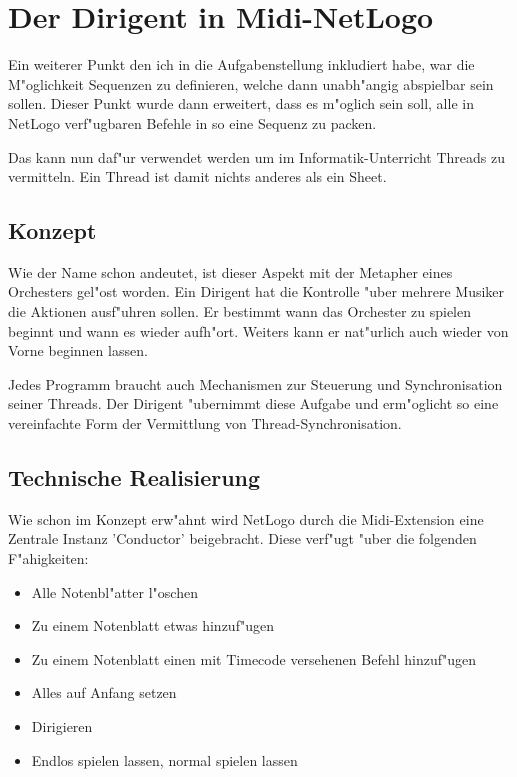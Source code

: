 \section{Der Dirigent in Midi-NetLogo}
Ein weiterer Punkt den ich in die Aufgabenstellung inkludiert habe, war die
M"oglichkeit Sequenzen zu definieren, welche dann unabh"angig abspielbar sein 
sollen. Dieser Punkt wurde dann erweitert, dass es m"oglich sein soll, alle
in NetLogo verf"ugbaren Befehle in so eine Sequenz zu packen. 

Das kann nun daf"ur verwendet werden um im Informatik-Unterricht Threads zu
vermitteln. Ein Thread ist damit nichts anderes als ein Sheet. 

\subsection{Konzept}
Wie der Name schon andeutet, ist dieser Aspekt mit der Metapher eines Orchesters
gel"ost worden. Ein Dirigent hat die Kontrolle "uber mehrere Musiker die 
Aktionen ausf"uhren sollen. Er bestimmt wann das Orchester zu spielen beginnt
und wann es wieder aufh"ort. Weiters kann er nat"urlich auch wieder von Vorne
beginnen lassen.

Jedes Programm braucht auch Mechanismen zur Steuerung und Synchronisation 
seiner Threads. Der Dirigent "ubernimmt diese Aufgabe und erm"oglicht so eine
vereinfachte Form der Vermittlung von Thread-Synchronisation. 

\subsection{Technische Realisierung}
Wie schon im Konzept erw"ahnt wird NetLogo durch die Midi-Extension eine Zentrale Instanz 'Conductor'
beigebracht. Diese verf"ugt "uber die folgenden F"ahigkeiten: \begin{itemize}
\item Alle Notenbl"atter l"oschen
\item Zu einem Notenblatt etwas hinzuf"ugen
\item Zu einem Notenblatt einen mit Timecode versehenen Befehl hinzuf"ugen
\item Alles auf Anfang setzen
\item Dirigieren
\item Endlos spielen lassen, normal spielen lassen
\end{itemize}

